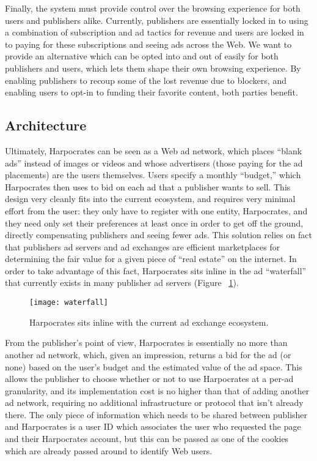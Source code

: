 Finally, the system must provide control over the browsing experience for both users and publishers alike.
Currently, publishers are essentially locked in to using a combination of subscription and ad tactics for revenue and users are locked in to paying for these subscriptions and seeing ads across the Web.
We want to provide an alternative which can be opted into and out of easily for both publishers and users, which lets them shape their own browsing experience.
By enabling publishers to recoup some of the lost revenue due to blockers, and enabling users to opt-in to funding their favorite content, both parties benefit.

\subsection{Architecture}
Ultimately, Harpocrates can be seen as a Web ad network, which places ``blank ads'' instead of images or videos and whose advertisers (those paying for the ad placements) are the users themselves.
Users specify a monthly ``budget,'' which Harpocrates then uses to bid on each ad that a publisher wants to sell.
This design very cleanly fits into the current ecosystem, and requires very minimal effort from the user: they only have to register with one entity, Harpocrates, and they need only set their preferences at least once in order to get off the ground, directly compensating publishers and seeing fewer ads.
This solution relies on fact that publishers ad servers and ad exchanges are efficient marketplaces for determining the fair value for a given piece of ``real estate'' on the internet.
In order to take advantage of this fact, Harpocrates sits inline in the ad ``waterfall'' that currently exists in many publisher ad servers (Figure ~\ref{fig:waterfall}).

\begin{figure}[h]
\centering
\texttt{[image: waterfall]}
\caption{Harpocrates sits inline with the current ad exchange ecosystem.}
\label{fig:waterfall}
\end{figure}

From the publisher's point of view, Harpocrates is essentially no more than another ad network, which, given an impression, returns a bid for the ad (or none) based on the user's budget and the estimated value of the ad space.
This allows the publisher to choose whether or not to use Harpocrates at a per-ad granularity, and its implementation cost is no higher than that of adding another ad network, requiring no additional infrastructure or protocol that isn't already there.
The only piece of information which needs to be shared between publisher and Harpocrates is a user ID which associates the user who requested the page and their Harpocrates account, but this can be passed as one of the cookies which are already passed around to identify Web users.

